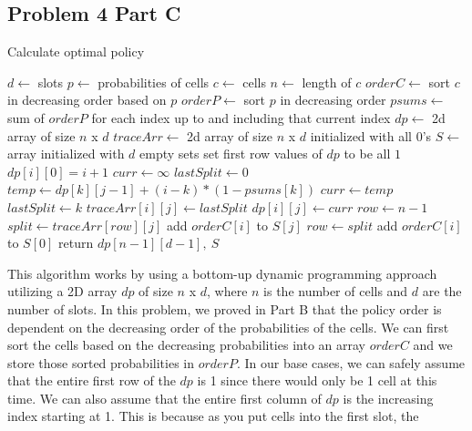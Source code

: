 \documentclass[12pt]{article}
\begin{document}
\subsection*{Problem 4 Part C}
\begin{algorithm}
\caption{Calculate optimal policy}
\begin{algorithmic}[1]
\State $d \gets $ slots
\State $p \gets $ probabilities of cells
\State $c \gets $ cells
\State $n \gets $ length of $c$
\State $orderC \gets $ sort $c$ in decreasing order based on $p$
\State $orderP \gets $ sort $p$ in decreasing order
\State $psums \gets $ sum of $orderP$ for each index up to and including that current index
\State
\State $dp \gets $ 2d array of size $n$ x $d$
\State $traceArr \gets $ 2d array of size $n$ x $d$ initialized with all 0's
\State $S \gets $array initialized with $d$ empty sets
\State
\State set first row values of $dp$ to be all $1$
    \State $dp[i][0] = i + 1$
\EndFor
\State
{}
        \State $curr \gets \infty$
        \State $lastSplit \gets 0$
            \State $temp \gets dp[k][j-1] + (i-k) * (1-psums[k])$ 
                \State $curr \gets temp$
                \State $lastSplit \gets k$
            \EndIf
        \EndFor
        \State $traceArr[i][j] \gets lastSplit$
        \State $dp[i][j] \gets curr$
    \EndFor
\EndFor
\State $row \gets n - 1$
    \State $split \gets traceArr[row][j]$
        \State add $orderC[i]$ to $S[j]$
    \EndFor
    \State $row \gets split$
\EndFor
{}
    \State add $orderC[i]$ to $S[0]$
\EndFor
\State return $dp[n-1][d-1],\ S$
\end{algorithmic}
\end{algorithm}
\noindent
This algorithm works by using a bottom-up dynamic programming approach utilizing a 2D array $dp$ of size 
$n$ x $d$, where $n$ is the number of cells and $d$ are the number of slots. In this problem, we proved
in Part B that the policy order is dependent on the decreasing order of the probabilities of the cells.
We can first sort the cells based on the decreasing probabilities into an array $orderC$ and we store those 
sorted probabilities in $orderP$. In our base cases, we can safely assume that the entire first row of the
$dp$ is 1 since there would only be 1 cell at this time. We can also assume that the entire first column 
of $dp$ is the increasing index starting at 1. This is because as you put cells into the first slot, the 
\end{document}
